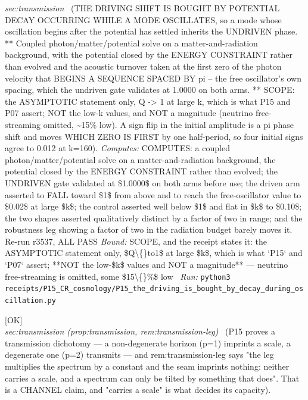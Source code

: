 \begin{description}
\textit{sec:transmission} \ (THE DRIVING SHIFT IS BOUGHT BY POTENTIAL DECAY OCCURRING WHILE A MODE OSCILLATES, so a mode whose oscillation begins after the potential has settled inherits the UNDRIVEN phase. ** Coupled photon/matter/potential solve on a matter-and-radiation background, with the potential closed by the ENERGY CONSTRAINT rather than evolved and the acoustic turnover taken at the first zero of the photon velocity that BEGINS A SEQUENCE SPACED BY pi -- the free oscillator's own spacing, which the undriven gate validates at 1.0000 on both arms. ** SCOPE: the ASYMPTOTIC statement only, Q -> 1 at large k, which is what P15 and P07 assert; NOT the low-k values, and NOT a magnitude (neutrino free-streaming omitted, \textasciitilde{}15\% low). A sign flip in the initial amplitude is a pi phase shift and moves WHICH ZERO IS FIRST by one half-period, so four initial signs agree to 0.012 at k=160). 
\emph{Computes:} COMPUTES: a coupled photon/matter/potential solve on a matter-and-radiation background, the potential closed by the ENERGY CONSTRAINT rather than evolved; the UNDRIVEN gate validated at \$1.0000\$ on both arms before use; the driven arm asserted to FALL toward \$1\$ from above and to reach the free-oscillator value to \$0.02\$ at large \$k\$; the control asserted well below \$1\$ and flat in \$k\$ to \$0.10\$; the two shapes asserted qualitatively distinct by a factor of two in range; and the robustness leg showing a factor of two in the radiation budget barely moves it. Re-run r3537, ALL PASS
 \emph{Bound:} SCOPE, and the receipt states it: the ASYMPTOTIC statement only, \$Q\textbackslash\{\}to1\$ at large \$k\$, which is what `P15` and `P07` assert; **NOT the low-\$k\$ values and NOT a magnitude** --- neutrino free-streaming is omitted, some \$15\textbackslash\{\}\%\$ low
\ \emph{Run:} \texttt{python3 receipts/P15\_CR\_cosmology/P15\_the\_driving\_is\_bought\_by\_decay\_during\_oscillation.py}
\item[\rcptlabel{N8_the_transmission_dichotomy_is_a_capacity_dichotomy}{P15R151}\textbf{P15R151}\quad\texttt{N8\_the\_transmission\_dichotomy\_is\_a\_capacity\_dichotomy}]\hfill\textsf{[OK]}\\
\textit{sec:transmission (prop:transmission, rem:transmission-leg)} \ (P15 proves a transmission dichotomy --- a non-degenerate horizon (p=1) imprints a scale, a degenerate one (p=2) transmits --- and rem:transmission-leg says "the leg multiplies the spectrum by a constant and the seam imprints nothing: neither carries a scale, and a spectrum can only be tilted by something that does". That is a CHANNEL claim, and "carries a scale" is what decides its capacity). 

\end{description}
